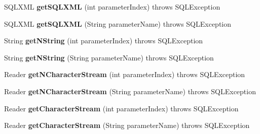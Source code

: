 \begin{DoxyCompactItemize}
S\+Q\+L\+X\+ML {\bfseries get\+S\+Q\+L\+X\+ML} (int parameter\+Index)  throws S\+Q\+L\+Exception 
\item 
\mbox{\label{classcom_1_1mysql_1_1cj_1_1jdbc_1_1_callable_statement_wrapper_a2a75a8688d617b3469a58574bb1d2ba7}} 
S\+Q\+L\+X\+ML {\bfseries get\+S\+Q\+L\+X\+ML} (String parameter\+Name)  throws S\+Q\+L\+Exception 
\item 
\mbox{\label{classcom_1_1mysql_1_1cj_1_1jdbc_1_1_callable_statement_wrapper_a0f35a6165ab26337a2d2501ede1e5616}} 
String {\bfseries get\+N\+String} (int parameter\+Index)  throws S\+Q\+L\+Exception 
\item 
\mbox{\label{classcom_1_1mysql_1_1cj_1_1jdbc_1_1_callable_statement_wrapper_a51e2115d2f86be9a535d0eded9cedcf0}} 
String {\bfseries get\+N\+String} (String parameter\+Name)  throws S\+Q\+L\+Exception 
\item 
\mbox{\label{classcom_1_1mysql_1_1cj_1_1jdbc_1_1_callable_statement_wrapper_a901c8803e72bd7120f17b9235379d3d5}} 
Reader {\bfseries get\+N\+Character\+Stream} (int parameter\+Index)  throws S\+Q\+L\+Exception 
\item 
\mbox{\label{classcom_1_1mysql_1_1cj_1_1jdbc_1_1_callable_statement_wrapper_a27261d421ab4d0f76421435281a0e69c}} 
Reader {\bfseries get\+N\+Character\+Stream} (String parameter\+Name)  throws S\+Q\+L\+Exception 
\item 
\mbox{\label{classcom_1_1mysql_1_1cj_1_1jdbc_1_1_callable_statement_wrapper_a039096af3fce288f9be2f23fa9639cc9}} 
Reader {\bfseries get\+Character\+Stream} (int parameter\+Index)  throws S\+Q\+L\+Exception 
\item 
\mbox{\label{classcom_1_1mysql_1_1cj_1_1jdbc_1_1_callable_statement_wrapper_a9f98975895bddea7ea81e076697576a6}} 
Reader {\bfseries get\+Character\+Stream} (String parameter\+Name)  throws S\+Q\+L\+Exception 

\end{DoxyCompactItemize}

